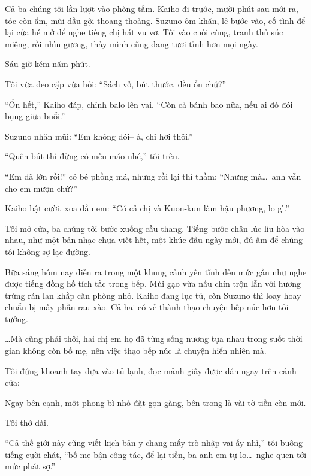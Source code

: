 \documentclass[../main.tex]{subfiles}
\begin{document}
Cả ba chúng tôi lần lượt vào phòng tắm. Kaiho đi trước, mười phút sau mới ra, tóc còn ẩm, mùi dầu gội thoang thoảng. Suzuno ôm khăn, lê bước vào, cố tình để lại cửa hé mở để nghe tiếng chị hát vu vơ. Tôi vào cuối cùng, tranh thủ súc miệng, rồi nhìn gương, thấy mình cũng đang tươi tỉnh hơn mọi ngày.

\ct

Sáu giờ kém năm phút.

Tôi vừa đeo cặp vừa hỏi: ``Sách vở, bút thước, đều ổn chứ?''

``Ổn hết,'' Kaiho đáp, chỉnh balo lên vai. ``Còn cả bánh bao nữa, nếu ai đó đói bụng giữa buổi.''

Suzuno nhăn mũi: ``Em không đói-- à, chỉ hơi thôi.''

``Quên bút thì đừng có mếu máo nhé,'' tôi trêu.

``Em đã lớn rồi!'' cô bé phồng má, nhưng rồi lại thì thầm: ``Nhưng mà\dots\ anh vẫn cho em mượn chứ?''

Kaiho bật cười, xoa đầu em: ``Có cả chị và Kuon-kun làm hậu phương, lo gì.''

Tôi mở cửa, ba chúng tôi bước xuống cầu thang. Tiếng bước chân lúc lỉu hòa vào nhau, như một bản nhạc chưa viết hết, một khúc đầu ngày mới, đủ ấm để chúng tôi không sợ lạc đường.

\ct

Bữa sáng hôm nay diễn ra trong một khung cảnh yên tĩnh đến mức gần như nghe được tiếng đồng hồ tích tắc trong bếp. Mùi gạo vừa nấu chín trộn lẫn với hương trứng rán lan khắp căn phòng nhỏ. Kaiho đang lục tủ, còn Suzuno thì loay hoay chuẩn bị mấy phần rau xào. Cả hai có vẻ thành thạo chuyện bếp núc hơn tôi tưởng.

\dots Mà cũng phải thôi, hai chị em họ đã từng sống nương tựa nhau trong suốt thời gian không còn bố mẹ, nên việc thạo bếp núc là chuyện hiển nhiên mà.

Tôi đứng khoanh tay dựa vào tủ lạnh, đọc mảnh giấy được dán ngay trên cánh cửa:


Ngay bên cạnh, một phong bì nhỏ đặt gọn gàng, bên trong là vài tờ tiền còn mới.

Tôi thở dài.

``Cả thế giới này cũng viết kịch bản y chang mấy trò nhập vai ấy nhỉ,'' tôi buông tiếng cười chát, ``bố mẹ bận công tác, để lại tiền, ba anh em tự lo\dots\ nghe quen tới mức phát sợ.''
\end{document}
